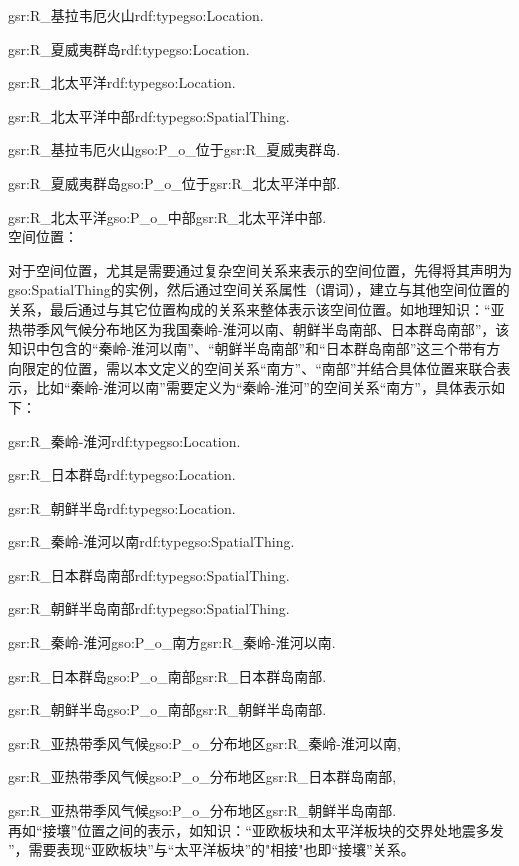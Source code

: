 gsr:R\_基拉韦厄火山\quad rdf:type\quad  gso:Location\quad  .

gsr:R\_夏威夷群岛\quad rdf:type\quad  gso:Location\quad  .

gsr:R\_北太平洋\quad rdf:type\quad  gso:Location\quad  .

gsr:R\_北太平洋中部\quad rdf:type\quad  gso:SpatialThing\quad  .

gsr:R\_基拉韦厄火山\quad  gso:P\_o\_位于\quad  gsr:R\_夏威夷群岛\quad  .

gsr:R\_夏威夷群岛\quad  gso:P\_o\_位于\quad  gsr:R\_北太平洋中部\quad  .

gsr:R\_北太平洋\quad  gso:P\_o\_中部\quad  gsr:R\_北太平洋中部\quad  .
\\

空间位置：

对于空间位置，尤其是需要通过复杂空间关系来表示的空间位置，先得将其声明为gso:SpatialThing的实例，然后通过空间关系属性（谓词），建立与其他空间位置的关系，最后通过与其它位置构成的关系来整体表示该空间位置。如地理知识：“亚热带季风气候分布地区为我国秦岭-淮河以南、朝鲜半岛南部、日本群岛南部”，该知识中包含的“秦岭-淮河以南”、“朝鲜半岛南部”和“日本群岛南部”这三个带有方向限定的位置，需以本文定义的空间关系“南方”、“南部”并结合具体位置来联合表示，比如“秦岭-淮河以南”需要定义为“秦岭-淮河”的空间关系“南方”，具体表示如下：

gsr:R\_秦岭-淮河\quad rdf:type\quad gso:Location\quad .

gsr:R\_日本群岛\quad rdf:type\quad gso:Location\quad .

gsr:R\_朝鲜半岛\quad rdf:type\quad gso:Location\quad .

gsr:R\_秦岭-淮河以南\quad rdf:type\quad gso:SpatialThing\quad .

gsr:R\_日本群岛南部\quad rdf:type\quad gso:SpatialThing\quad .

gsr:R\_朝鲜半岛南部\quad rdf:type\quad gso:SpatialThing\quad .

gsr:R\_秦岭-淮河\quad gso:P\_o\_南方\quad gsr:R\_秦岭-淮河以南\quad .

gsr:R\_日本群岛\quad gso:P\_o\_南部\quad gsr:R\_日本群岛南部\quad .

gsr:R\_朝鲜半岛\quad gso:P\_o\_南部\quad gsr:R\_朝鲜半岛南部\quad .

gsr:R\_亚热带季风气候\quad gso:P\_o\_分布地区\quad gsr:R\_秦岭-淮河以南\quad ,\quad 

gsr:R\_亚热带季风气候\quad gso:P\_o\_分布地区\quad gsr:R\_日本群岛南部\quad ,\quad 

gsr:R\_亚热带季风气候\quad gso:P\_o\_分布地区\quad gsr:R\_朝鲜半岛南部\quad .
\\
再如“接壤”位置之间的表示，如知识：“亚欧板块和太平洋板块的交界处地震多发
”，需要表现“亚欧板块”与“太平洋板块”的"相接"也即“接壤”关系。

